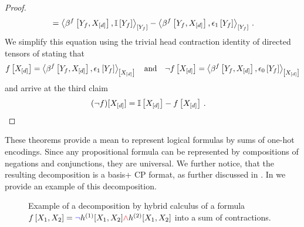 \begin{proof}
\begin{align*}
        &\quad=
        \contractionof{\bencodingofat{\exformula}{\formulavar,\shortcatvariables},\onesat{\formulavar}}{\formulavar}
        - \contractionof{\bencodingofat{\exformula}{\formulavar,\shortcatvariables},\tbasisat{\formulavar}}{\formulavar} \, .
    \end{align*}
    We simplify this equation using the trivial head contraction identity of directed tensors of  stating that %
    \begin{align*}
        \formulaat{\shortcatvariables} = \contractionof{\bencodingofat{\exformula}{\formulavar,\shortcatvariables},\tbasisat{\formulavar}}{\shortcatvariables}
        \andspace
        \lnot\formulaat{\shortcatvariables} = \contractionof{\bencodingofat{\exformula}{\formulavar,\shortcatvariables},\fbasisat{\formulavar}}{\shortcatvariables}
    \end{align*}
    and arrive at the third claim
    \begin{align*}
    (\lnot f)[X_{[d]}]
        = \mathbb{I}\left[X_{[d]}\right] - f\left[X_{[d]}\right]  \, . & \qedhere
    \end{align*}
\end{proof}

These theorems provide a mean to represent logical formulas by sums of one-hot encodings.
Since any propositional formula can be represented by compositions of negations and conjunctions, they are universal.
We further notice, that the resulting decomposition is a basis+ CP format, as further discussed in .
In  we provide an example of this decomposition.


\begin{figure}
    \begin{center}
        
    \end{center}
    \caption{
        Example of a decomposition by hybrid calculus of a formula
        $f\left[X_{1},X_{2}\right] = \textcolor{blue}{\lnot} h^{(1)}[X_{1},X_{2}] \textcolor{red}{\land}  h^{(2)}[X_{1},X_{2}]$ into a sum of contractions.
    }\label{fig:DecompositionExample}
\end{figure}

